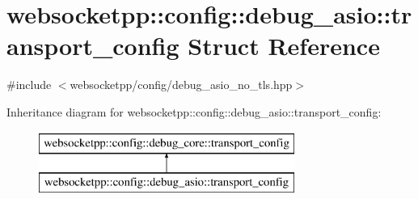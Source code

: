 \hypertarget{structwebsocketpp_1_1config_1_1debug__asio_1_1transport__config}{}\section{websocketpp\+:\+:config\+:\+:debug\+\_\+asio\+:\+:transport\+\_\+config Struct Reference}
\label{structwebsocketpp_1_1config_1_1debug__asio_1_1transport__config}


{\ttfamily \#include $<$websocketpp/config/debug\+\_\+asio\+\_\+no\+\_\+tls.\+hpp$>$}

Inheritance diagram for websocketpp\+:\+:config\+:\+:debug\+\_\+asio\+:\+:transport\+\_\+config\+:\begin{figure}[H]
\begin{center}
\leavevmode
\includegraphics[height=2.000000cm]{structwebsocketpp_1_1config_1_1debug__asio_1_1transport__config}
\end{center}
\end{figure}

